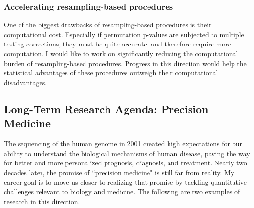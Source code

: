 \documentclass[11pt]{article}
\begin{document}
\subsubsection*{Accelerating resampling-based procedures}

One of the biggest drawbacks of resampling-based procedures is their computational cost. Especially if permutation p-values are subjected to multiple testing corrections, they must be quite accurate, and therefore require more computation. I would like to work on significantly reducing the computational burden of resampling-based procedures. Progress in this direction would help the statistical advantages of these procedures outweigh their computational disadvantages. %


\subsection*{Long-Term Research Agenda: Precision Medicine}

The sequencing of the human genome in 2001 created high expectations for our ability to understand the biological mechanisms of human disease, paving the way for better and more personalized prognosis, diagnosis, and treatment. Nearly two decades later, the promise of ``precision medicine" is still far from reality. My career goal is to move us closer to realizing that promise by tackling quantitative challenges relevant to biology and medicine. The following are two examples of research in this direction.
\end{document}

